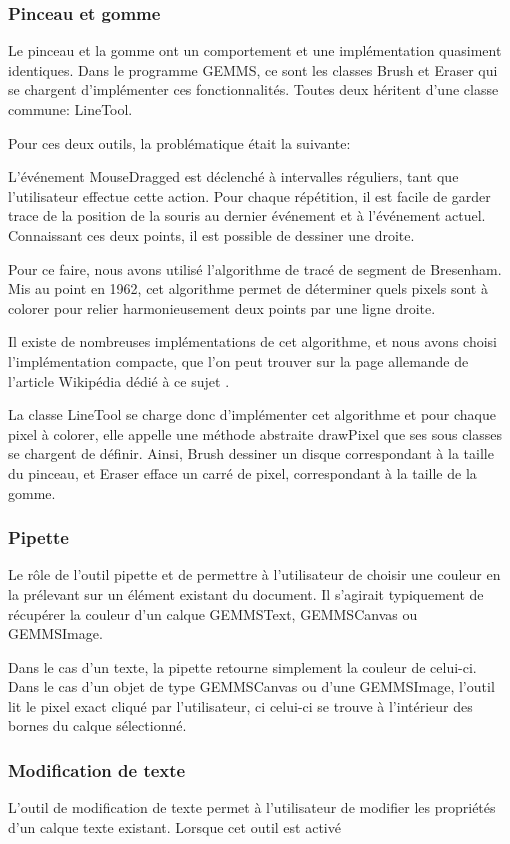 \subsubsection{Pinceau et gomme}
Le pinceau et la gomme ont un comportement et une implémentation quasiment identiques. Dans le programme GEMMS, ce sont les classes Brush et Eraser qui se chargent d'implémenter ces fonctionnalités. Toutes deux héritent d'une classe commune: LineTool. 
\par
Pour ces deux outils, la problématique était la suivante: 
\par 
L'événement MouseDragged est déclenché à intervalles réguliers, tant que l'utilisateur effectue cette action. Pour chaque répétition, il est facile de garder trace de la position de la souris au dernier événement et à l'événement actuel. Connaissant ces deux points, il est possible de dessiner une droite.
\par
Pour ce faire, nous avons utilisé l'algorithme de tracé de segment de Bresenham. Mis au point en 1962, cet algorithme permet de déterminer quels pixels sont à colorer pour relier harmonieusement deux points par une ligne droite.
\par
Il existe de nombreuses implémentations de cet algorithme, et nous avons choisi l'implémentation compacte, que l'on peut trouver sur la page allemande de l'article Wikipédia dédié à ce sujet \cite{Bresenham}.
\par
La classe LineTool se charge donc d'implémenter cet algorithme et pour chaque pixel à colorer, elle appelle une méthode abstraite drawPixel que ses sous classes se chargent de définir. Ainsi, Brush dessiner un disque correspondant à la taille du pinceau, et Eraser efface un carré de pixel, correspondant à la taille de la gomme.
\subsubsection{Pipette}
Le rôle de l'outil pipette et de permettre à l'utilisateur de choisir une couleur en la prélevant sur un élément existant du document. Il s'agirait typiquement de récupérer la couleur d'un calque GEMMSText, GEMMSCanvas ou GEMMSImage.
\par 
Dans le cas d'un texte, la pipette retourne simplement la couleur de celui-ci. Dans le cas d'un objet de type GEMMSCanvas ou d'une GEMMSImage, l'outil lit le pixel exact cliqué par l'utilisateur, ci celui-ci se trouve à l'intérieur des bornes du calque sélectionné.
\subsubsection{Modification de texte}
L'outil de modification de texte permet à l'utilisateur de modifier les propriétés d'un calque texte existant. Lorsque cet outil est activé
